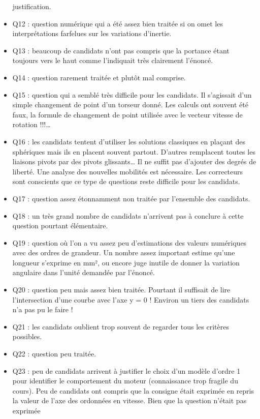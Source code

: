 \documentclass[10pt,fleqn]{article} %
\begin{document}
\begin{itemize}
justification.
\item Q12 : question numérique qui a été assez bien traitée si on omet les interprétations farfelues
sur les variations d’inertie.
\item Q13 : beaucoup de candidats n’ont pas compris que la portance étant toujours vers le haut
comme l’indiquait très clairement l’énoncé.
\item Q14 : question rarement traitée et plutôt mal comprise.
\item Q15 : question qui a semblé très difficile pour les candidats. Il s’agissait d’un simple
changement de point d’un torseur donné. Les calculs ont souvent été faux, la formule de
changement de point utilisée avec le vecteur vitesse de rotation !!!…
\item Q16 : les candidats tentent d’utiliser les solutions classiques en plaçant des sphériques mais
ils en placent souvent partout. D’autres remplacent toutes les liaisons pivots par des pivots
glissants… Il ne suffit pas d’ajouter des degrés de liberté. Une analyse des nouvelles
mobilités est nécessaire. Les correcteurs sont conscients que ce type de questions reste
difficile pour les candidats.
\item Q17 : question assez étonnamment non traitée par l’ensemble des candidats.
\item Q18 : un très grand nombre de candidats n’arrivent pas à conclure à cette question pourtant
élémentaire.
\item Q19 : question où l’on a vu assez peu d’estimations des valeurs numériques avec des
ordres de grandeur. Un nombre assez important estime qu’une longueur s’exprime en mm²,
ou encore juge inutile de donner la variation angulaire dans l’unité demandée par l’énoncé.
\item Q20 : question peu mais assez bien traitée. Pourtant il suffisait de lire l’intersection d’une
courbe avec l’axe y = 0 ! Environ un tiers des candidats n’a pas pu le faire !
\item Q21 : les candidats oublient trop souvent de regarder tous les critères possibles.
\item Q22 : question peu traitée.
\item Q23 : peu de candidats arrivent à justifier le choix d’un modèle d’ordre 1 pour identifier le
comportement du moteur (connaissance trop fragile du cours). Peu de candidats ont
compris que la consigne était exprimée en %
repris la valeur de l’axe des ordonnées en vitesse. Bien que la question n’était pas exprimée

\end{itemize}
\end{document}
